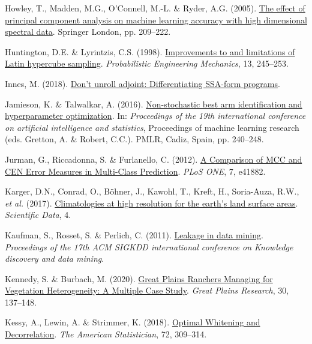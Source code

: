 \documentclass[
  letterpaper,
]{scrbook}
\newlength{\cslhangindent}
\newenvironment{CSLReferences}[2] %
 {\begin{list}{}{%
  \setlength{\itemindent}{0pt}
  \setlength{\leftmargin}{0pt}
  \setlength{\parsep}{0pt}
  \ifodd #1
   \setlength{\leftmargin}{\cslhangindent}
   \setlength{\itemindent}{-1\cslhangindent}
  \fi
  \setlength{\itemsep}{#2\baselineskip}}}
 {\end{list}}
\begin{document}
\begin{CSLReferences}{1}{0}
Howley, T., Madden, M.G., O'Connell, M.-L. \& Ryder, A.G. (2005).
\href{https://doi.org/10.1007/1-84628-224-1_16}{The effect of principal
component analysis on machine learning accuracy with high dimensional
spectral data}. Springer London, pp. 209--222.

Huntington, D.E. \& Lyrintzis, C.S. (1998).
\href{https://doi.org/10.1016/s0266-8920(97)00013-1}{Improvements to and
limitations of Latin hypercube sampling}. \emph{Probabilistic
Engineering Mechanics}, 13, 245--253.

Innes, M. (2018). \href{https://doi.org/10.48550/ARXIV.1810.07951}{Don't
unroll adjoint: Differentiating SSA-form programs}.

Jamieson, K. \& Talwalkar, A. (2016).
\href{https://proceedings.mlr.press/v51/jamieson16.html}{Non-stochastic
best arm identification and hyperparameter optimization}. In:
\emph{Proceedings of the 19th international conference on artificial
intelligence and statistics}, Proceedings of machine learning research
(eds. Gretton, A. \& Robert, C.C.). PMLR, Cadiz, Spain, pp. 240--248.

Jurman, G., Riccadonna, S. \& Furlanello, C. (2012).
\href{https://doi.org/10.1371/journal.pone.0041882}{A Comparison of MCC
and CEN Error Measures in Multi-Class Prediction}. \emph{PLoS ONE}, 7,
e41882.

Karger, D.N., Conrad, O., Böhner, J., Kawohl, T., Kreft, H., Soria-Auza,
R.W., \emph{et al.} (2017).
\href{https://doi.org/10.1038/sdata.2017.122}{Climatologies at high
resolution for the earth{'}s land surface areas}. \emph{Scientific
Data}, 4.

Kaufman, S., Rosset, S. \& Perlich, C. (2011).
\href{https://doi.org/10.1145/2020408.2020496}{Leakage in data mining}.
\emph{Proceedings of the 17th ACM SIGKDD international conference on
Knowledge discovery and data mining}.

Kennedy, S. \& Burbach, M. (2020).
\href{https://doi.org/10.1353/gpr.2020.0016}{Great Plains Ranchers
Managing for Vegetation Heterogeneity: A Multiple Case Study}.
\emph{Great Plains Research}, 30, 137--148.

Kessy, A., Lewin, A. \& Strimmer, K. (2018).
\href{https://doi.org/10.1080/00031305.2016.1277159}{Optimal Whitening
and Decorrelation}. \emph{The American Statistician}, 72, 309--314.


\end{CSLReferences}
\end{document}

